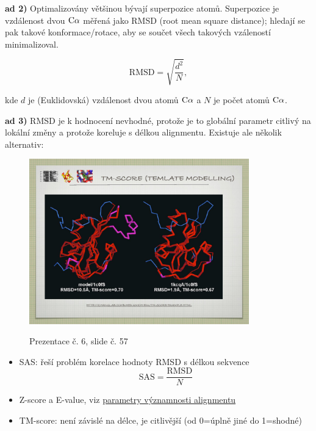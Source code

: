\documentclass[DIV=8]{scrreprt}
\begin{document}
\textbf{ad 2)} Optimalizovány většinou bývají superpozice atomů. Superpozice je vzdálenost dvou \(\ce{C\alpha}\) měřená jako RMSD (root mean square distance); hledají se pak takové konformace/rotace, aby se součet všech takových vzáleností minimalizoval.

\[\text{RMSD} = \sqrt{\frac{d^2}{N}},\]

kde \(d\) je (Euklidovská) vzdálenost dvou atomů \(\ce{C\alpha}\) a \(N\) je počet atomů \(\ce{C\alpha}\).

\textbf{ad 3)} RMSD je k hodnocení nevhodné, protože je to globální parametr citlivý na lokální změny a protože koreluje s délkou alignmentu. Existuje ale několik alternativ:

\begin{figure}
    \caption{Prezentace č. 6, slide č. 57}
    \includegraphics[width=0.85\textwidth]{slides-6/slide-57.jpg}
    \centering
    \label{slides-6-slide-57}
\end{figure}

\begin{itemize}[nosep]
    \item SAS: řeší problém korelace hodnoty RMSD s délkou sekvence
  \[\text{SAS} = \frac{\text{RMSD}}{N}\]
    \item Z-score a E-value, viz \href{Parametry významnosti alignmentu}{para­me­try výz­nam­nos­ti align­men­tu}
    \item TM-score: není závislé na délce, je citlivější (od 0=úplně jiné do 1=shodné)
\end{itemize}
\end{document}
